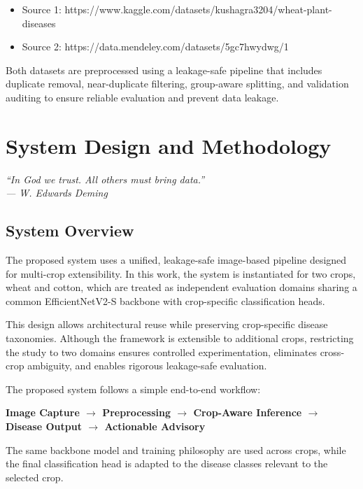 \documentclass[12pt,a4paper]{report}
\begin{document}
\begin{itemize}
\item Source 1: https://www.kaggle.com/datasets/kushagra3204/wheat-plant-diseases
\item Source 2: https://data.mendeley.com/datasets/5gc7hwydwg/1
\end{itemize}

Both datasets are preprocessed using a leakage-safe pipeline that includes duplicate removal, near-duplicate filtering, group-aware splitting, and validation auditing to ensure reliable evaluation and prevent data leakage.

\chapter{System Design and Methodology}

\begin{center}
\itshape
“In God we trust. All others must bring data.”\\
\vspace{0.3cm}
— W. Edwards Deming
\end{center}

\vspace{1cm}
 
\section{System Overview}
The proposed system uses a unified, leakage-safe image-based pipeline designed for multi-crop extensibility. In this work, the system is instantiated for two crops, wheat and cotton, which are treated as independent evaluation domains sharing a common EfficientNetV2-S backbone with crop-specific classification heads.

This design allows architectural reuse while preserving crop-specific disease taxonomies. Although the framework is extensible to additional crops, restricting the study to two domains ensures controlled experimentation, eliminates cross-crop ambiguity, and enables rigorous leakage-safe evaluation.

The proposed system follows a simple end-to-end workflow:
\begin{center}
\textbf{Image Capture $\rightarrow$ Preprocessing $\rightarrow$ Crop-Aware Inference $\rightarrow$ Disease Output $\rightarrow$ Actionable Advisory}
\end{center}
The same backbone model and training philosophy are used across crops, while the final classification head is adapted to the disease classes relevant to the selected crop.
\end{document}
